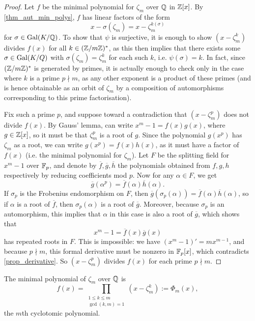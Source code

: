 \begin{proof}
    Let $f$ be the minimal polynomial for $\zeta_m$ over $\mathbb{{Q}}$ in $\mathbb{{Z}}[x]$. By \cref{thm_aut_min_polys}, $f$ has linear factors of the form
    \[
        x - \sigma(\zeta_m) = x - \zeta_m^{k(\sigma)}
    \]
    for $\sigma \in \operatorname{Gal}(K/\mathbb{Q})$. To show that $\psi$ is surjective, it is enough to show $(x - \zeta_m^k)$ divides $f(x)$ for all $k \in (\mathbb{{Z}}/{{m}}\mathbb{{Z}})^*$, as this then implies that there exists some $\sigma \in \operatorname{Gal}(K/Q)$ with $\sigma(\zeta_m) = \zeta_m^k$ for each such $k$, i.e. $\psi(\sigma) = k$. In fact, since $(\mathbb{{Z}}/{{m}}\mathbb{{Z}})^*$ is generated by primes, it is actually enough to check only in the case where $k$ is a prime $p \nmid m$, as any other exponent is a product of these primes (and is hence obtainable as an orbit of $\zeta_m$ by a composition of automorphisms corresponding to this prime factorisation).
    
    Fix such a prime $p$, and suppose toward a contradiction that $(x - \zeta_m^p)$ does not divide $f(x)$. By Gauss' lemma, can write $x^m - 1 = f(x)g(x)$, where $g \in \mathbb{{Z}}[x]$, so it must be that $\zeta_m^p$ is a root of $g$. Since the polynomial $g(x^p)$ has $\zeta_m$ as a root, we can write $g(x^p) = f(x)h(x)$, as it must have a factor of $f(x)$ (i.e. the minimal polynomial for $\zeta_m$). Let $F$ be the splitting field for $x^m - 1$ over $\mathbb{{F}}_p$, and denote by $\overline{f}, \overline{g}, \overline{h}$ the polynomials obtained from $f, g, h$ respectively by reducing coefficients mod $p$. Now for any $\alpha \in F$, we get
    \[
        \overline{g}(\alpha^p) = \overline{f}(\alpha)\overline{h}(\alpha).
    \]
    If $\sigma_p$ is the Frobenius endomorphism on $F$, then $\overline{g}(\sigma_p(\alpha)) = \overline{f}(\alpha) \overline{h}(\alpha)$, so if $\alpha$ is a root of $\overline{f}$, then $\sigma_p(\alpha)$ is a root of $\overline{g}$. Moreover, because $\sigma_p$ is an automorphism, this implies that $\alpha$ in this case is also a root of $\overline{g}$, which shows that
    \[
        x^m - 1 = \overline{f}(x) \overline{g}(x)
    \]
    has repeated roots in $F$. This is impossible: we have $(x^m - 1)' = mx^{m - 1}$, and because $p \nmid m$, this formal derivative must be nonzero in $\mathbb{{F}}_p[x]$, which contradicts \cref{prop_derivative}. So $(x - \zeta_m^p)$ divides $f(x)$ for each prime $p \nmid m$.
\end{proof}

\begin{corollary}
    The minimal polynomial of $\zeta_m$ over $\mathbb{{Q}}$ is
    \[
        f(x) = \prod_{\substack{1 \leq k \leq m \\ \gcd(k, m) = 1}} (x - \zeta_m^k) := \Phi_m(x),
    \]
    the $m$th cyclotomic polynomial.
\end{corollary}

